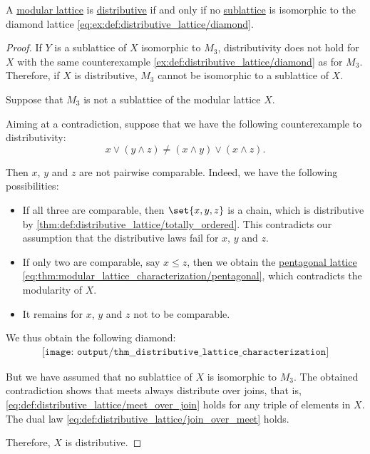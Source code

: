 \begin{proposition}\label{thm:distributive_modular_lattice_characterization}
  A \hyperref[def:modular_lattice]{modular lattice} is \hyperref[def:modular_lattice]{distributive} if and only if no \hyperref[def:lattice/submodel]{sublattice} is isomorphic to the diamond lattice \eqref{eq:ex:def:distributive_lattice/diamond}.
\end{proposition}
\begin{proof}
  \SufficiencySubProof If \( Y \) is a sublattice of \( X \) isomorphic to \( M_3 \), distributivity does not hold for \( X \) with the same counterexample \cref{ex:def:distributive_lattice/diamond} as for \( M_3 \). Therefore, if \( X \) is distributive, \( M_3 \) cannot be isomorphic to a sublattice of \( X \).

  \NecessitySubProof Suppose that \( M_3 \) is not a sublattice of the modular lattice \( X \).

  Aiming at a contradiction, suppose that we have the following counterexample to distributivity:
  \begin{equation*}
    x \vee (y \wedge z) \neq (x \wedge y) \vee (x \wedge z).
  \end{equation*}

  Then \( x \), \( y \) and \( z \) are not pairwise comparable. Indeed, we have the following possibilities:
  \begin{itemize}
    \item If all three are comparable, then \( \set{ x, y, z } \) is a chain, which is distributive by \cref{thm:def:distributive_lattice/totally_ordered}. This contradicts our assumption that the distributive laws fail for \( x \), \( y \) and \( z \).

    \item If only two are comparable, say \( x \leq z \), then we obtain the \hyperref[ex:def:modular_lattice/pentagon]{pentagonal lattice} \eqref{eq:thm:modular_lattice_characterization/pentagonal}, which contradicts the modularity of \( X \).

    \item It remains for \( x \), \( y \) and \( z \) not to be comparable.
  \end{itemize}

  We thus obtain the following diamond:
  \begin{equation}\label{eq:thm:distributive_lattice_characterization/diamond}
    \begin{aligned}
      \texttt{[image: output/thm\_\_distributive\_lattice\_characterization]}
    \end{aligned}
  \end{equation}

  But we have assumed that no sublattice of \( X \) is isomorphic to \( M_3 \). The obtained contradiction shows that meets always distribute over joins, that is, \eqref{eq:def:distributive_lattice/meet_over_join} holds for any triple of elements in \( X \). The dual law \eqref{eq:def:distributive_lattice/join_over_meet} holds.

  Therefore, \( X \) is distributive.
\end{proof}

